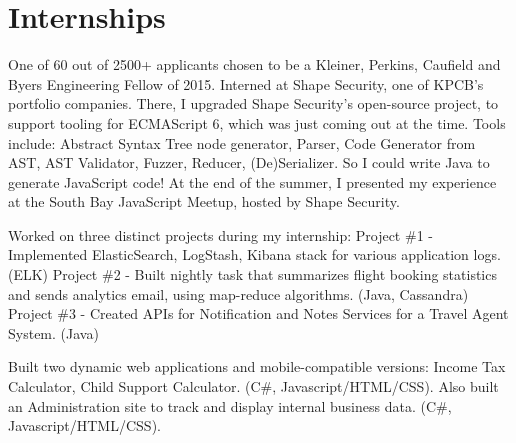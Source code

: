 \documentclass[letterpaper]{deedy-resume-openfont} %
\begin{document}
\begin{minipage}[t]{0.7\textwidth} %


\section{Internships}


One of 60 out of 2500+ applicants chosen to be a Kleiner, Perkins, Caufield and Byers Engineering Fellow of 2015. Interned at Shape Security, one of KPCB's portfolio companies. There, I upgraded Shape Security's open-source project, to support tooling for ECMAScript 6, which was just coming out at the time. Tools include: Abstract Syntax Tree node generator, Parser, Code Generator from AST, AST Validator, Fuzzer, Reducer, (De)Serializer. So I could write Java to generate JavaScript code! At the end of the summer, I presented my experience at the South Bay JavaScript Meetup, hosted by Shape Security. 

\sectionsep %



Worked on three distinct projects during my internship:
Project \#1 - Implemented ElasticSearch, LogStash, Kibana stack for various application logs. (ELK)
Project \#2 - Built nightly task that summarizes flight booking statistics and sends analytics email, using map-reduce algorithms. (Java, Cassandra)
Project \#3 - Created APIs for Notification and Notes Services for a Travel Agent System. (Java)

\sectionsep %



Built two dynamic web applications and mobile-compatible versions: Income Tax Calculator, Child Support Calculator. (C\#, Javascript/HTML/CSS). Also built an Administration site to track and display internal business data. (C\#, Javascript/HTML/CSS).



\end{minipage}
\end{document}
